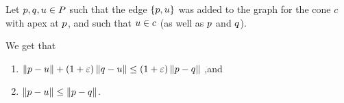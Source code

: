 \documentclass[12pt]{article}%
\begin{document}
\begin{lemma}
    Let $p,q,u\in P$ such that the edge $\{p, u\}$ was
    added to the graph for the cone $c$ with apex at $p$, and such
    that $u\in c$ (as well as $p$ and $q$).
	
    We get that
    \begin{enumerate}
        \item { $ \dY{\pa}{\pc}%
           +%
           (1+\eps)\dY{\pb}{\pc}%
           \leq%
           (1+\eps)\dY{\pa}{\pb}%
           $ ,and }
        \item { $ \dY{\pa}{\pc}%
           \leq%
           \dY{\pa}{\pb}%
           $.  }
    \end{enumerate}



\end{lemma}
\end{document}
